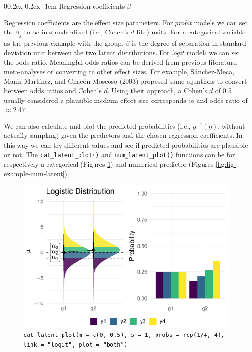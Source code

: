 \documentclass[
  man,floatsintext]{apa6}
\makeatletter
\let\oldparagraph\paragraph
\renewcommand{\paragraph}[1]{\oldparagraph{#1}\mbox{}}
\renewcommand{\paragraph}{\@startsection{paragraph}{4}{\parindent}%
  {0\baselineskip \@plus 0.2ex \@minus 0.2ex}%
  {-1em}%
  {\normalfont\normalsize\bfseries\itshape\typesectitle}}
\makeatother
\begin{document}
\normalsize

\paragraph{\texorpdfstring{Regression coefficients \(\beta\)}{Regression coefficients \textbackslash beta}}\label{regression-coefficients-beta}

Regression coefficients are the effect size parameters. For \emph{probit} models we can set the \(\beta_j\) to be in standardized (i.e., Cohen's \(d\)-like) units. For a categorical variable as the previous example with the group, \(\beta\) is the degree of separation in standard deviation unit between the two latent distributions. For \emph{logit} models we can set the odds ratio. Meaningful odds ratios can be derived from previous literature, meta-analyses or converting to other effect sizes. For example, Sánchez-Meca, Marín-Martínez, and Chacón-Moscoso (2003) proposed some equations to convert between odds ratios and Cohen's \(d\). Using their approach, a Cohen's \(d\) of 0.5 usually considered a plausible medium effect size corresponds to and odds ratio of \(\approx 2.47\).

We can also calculate and plot the predicted probabilities (i.e., \(g^{-1}(\eta)\), without actually sampling) given the predictors and the chosen regression coefficients. In this way we can try different values and see if predicted probabilities are plausible or not. The \texttt{cat\_latent\_plot()} and \texttt{num\_latent\_plot()} functions can be for respectively a categorical (Figures \ref{fig:fig-example-cat-latent}) and numerical predictor (Figures \ref{fig:fig-example-num-latent}).

\scriptsize

\begin{figure}

{\centering \includegraphics{paper-new_files/figure-latex/fig-example-cat-latent-1} 

}

\caption{\texttt{cat\_latent\_plot(m\ =\ c(0,\ 0.5),\ s\ =\ 1,\ probs\ =\ rep(1/4,\ 4),\ link\ =\ "logit",\ plot\ =\ "both")}}\label{fig:fig-example-cat-latent}
\end{figure}
\end{document}
